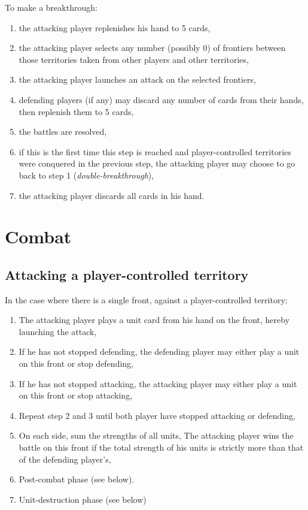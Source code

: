 \documentclass[a4paper]{article}
\begin{document}
    \hspace{-2em} To make a breakthrough:
    \vspace{-1.3em}
    \begin{enumerate}
        \item the attacking player replenishes his hand to 5 cards,
        \item the attacking player selects any number (possibly 0) of frontiers
        between those territories taken from other players and other territories,
        \item the attacking player launches an attack on the selected frontiers,
        \item defending players (if any) may discard any number of cards from their hands,
        then replenish them to 5 cards,
        \item the battles are resolved,
        \item if this is the first time this step is reached and player-controlled
        territories were conquered in the previous step, the attacking player may choose
        to go back to step 1 (\textit{double-breakthrough}),
        \item the attacking player discards all cards in his hand.
    \end{enumerate}


\newpage
\section{Combat}

  \subsection{Attacking a player-controlled territory}
  
    \hspace{-2em} In the case where there is a single front,
    against a player-controlled territory:
    \vspace{-1.3em}
    \begin{enumerate}
        \item The attacking player plays a unit card from his hand on the front,
        hereby launching the attack,
        \item If he has not stopped defending,
        the defending player may either play a unit on this front or stop defending,
        \item If he has not stopped attacking,
        the attacking player may either play a unit on this front or stop attacking,
        \item Repeat step 2 and 3 until both player have stopped attacking or defending,
        \item On each side, sum the strengths of all units,
        The attacking player wins the battle on this front if the total strength
        of his units is strictly more than that of the defending player's,
        \item Post-combat phase (see below).
        \item Unit-destruction phase (see below)
    \end{enumerate}
    
\end{document}

